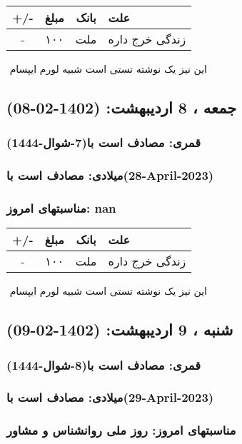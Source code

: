\documentclass{article}
\newcommand{\rnote}[1]{\marginpar{\textcolor{color}{\StrSubstitute{\##1}{ }{\_}}}}
\newcommand{\myRow}[4]{
    #1 & #2 & #3 & #4 \\ \hline
}
\begin{document}
\begin{tabular}{ | c | c | c | p{5cm} |}
    \hline
    \myRow{ +/- }{مبلغ}{بانک}{علت}
    \myRow{-}{۱۰۰}{ملت}{زندگی خرج داره}
\end{tabular}
\newline
\newline

‌
\rnote{تست}
این نیز یک نوشته تستی است شبیه لورم ایپسام




\newpage
{}
\textcolor{color}{
\section{ جمعه ، 8 اردیبهشت: (1402-02-08) }
\subsubsection*{قمری: مصادف است با(7-شوال-1444)} 
\subsubsection*{میلادی: مصادف است با(28-April-2023)}
\subsubsection*{مناسبتهای امروز: nan}
}


\begin{tabular}{ | c | c | c | p{5cm} |}
    \hline
    \myRow{ +/- }{مبلغ}{بانک}{علت}
    \myRow{-}{۱۰۰}{ملت}{زندگی خرج داره}
\end{tabular}
\newline
\newline

‌
\rnote{تست}
این نیز یک نوشته تستی است شبیه لورم ایپسام




\newpage
{}
\textcolor{color}{
\section{ شنبه ، 9 اردیبهشت: (1402-02-09) }
\subsubsection*{قمری: مصادف است با(8-شوال-1444)} 
\subsubsection*{میلادی: مصادف است با(29-April-2023)}
\subsubsection*{مناسبتهای امروز: روز ملی روانشناس و مشاور}
}
\end{document}
